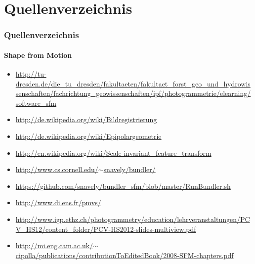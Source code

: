 \documentclass{beamer}
\begin{document}
\section{Quellenverzeichnis}
\begin{frame}
	\frametitle{Quellenverzeichnis}
	\framesubtitle{Shape from Motion}
	
	\begin{tiny}
	\begin{itemize}
		\item \href{http://tu-dresden.de/die\_tu\_dresden/fakultaeten/fakultaet\_forst\_geo\_und\_hydrowissenschaften/fachrichtung\_geowissenschaften/ipf/photogrammetrie/elearning/software\_sfm}{http://tu-dresden.de/die\_tu\_dresden/fakultaeten/fakultaet\_forst\_geo\_und\_hydrowissenschaften/fachrichtung\_geowissenschaften/ipf/photogrammetrie/elearning/software\_sfm}
		\item \href{http://de.wikipedia.org/wiki/Bildregistrierung}{http://de.wikipedia.org/wiki/Bildregistrierung}
		\item \href{http://de.wikipedia.org/wiki/Epipolargeometrie}{http://de.wikipedia.org/wiki/Epipolargeometrie}
		\item \href{http://en.wikipedia.org/wiki/Scale-invariant_feature_transform}{http://en.wikipedia.org/wiki/Scale-invariant\_feature\_transform}
		\item \href{http://www.cs.cornell.edu/~snavely/bundler/}{http://www.cs.cornell.edu/$\sim$snavely/bundler/}
		\item \href{https://github.com/snavely/bundler_sfm/blob/master/RunBundler.sh}{https://github.com/snavely/bundler\_sfm/blob/master/RunBundler.sh}
		\item \href{http://www.di.ens.fr/pmvs/}{http://www.di.ens.fr/pmvs/}
		\item \href{http://www.igp.ethz.ch/photogrammetry/education/lehrveranstaltungen/PCV_HS12/content_folder/PCV-HS2012-slides-multiview.pdf}{http://www.igp.ethz.ch/photogrammetry/education/lehrveranstaltungen/PCV\_HS12/content\_folder/PCV-HS2012-slides-multiview.pdf}
		\item \href{http://mi.eng.cam.ac.uk/~cipolla/publications/contributionToEditedBook/2008-SFM-chapters.pdf}{http://mi.eng.cam.ac.uk/$\sim$cipolla/publications/contributionToEditedBook/2008-SFM-chapters.pdf}
	\end{itemize}
	\end{tiny}
\end{frame}



\end{document}
